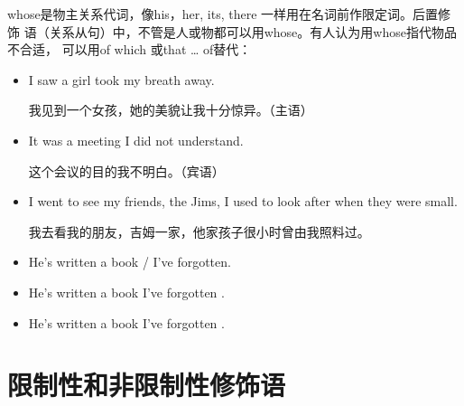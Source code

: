 whose是物主关系代词，像his，her, its, there 一样用在名词前作限定词。后置修饰
语（关系从句）中，不管是人或物都可以用whose。有人认为用whose指代物品不合适，
可以用of which 或that \ldots{} of替代：
\begin{itemize}
\item I saw a girl  took my breath away.

  我见到一个女孩，她的美貌让我十分惊异。（主语）

\item It was a meeting  I did not understand.

  这个会议的目的我不明白。（宾语）


\item I went to see my friends, the Jims,  I used to
  look after when they were small.

  我去看我的朋友，吉姆一家，他家孩子很小时曾由我照料过。


\item He's written a book / I've forgotten.
\item He's written a book  I've forgotten .
\item He's written a book  I've forgotten .
\end{itemize}


\section{限制性和非限制性修饰语}

